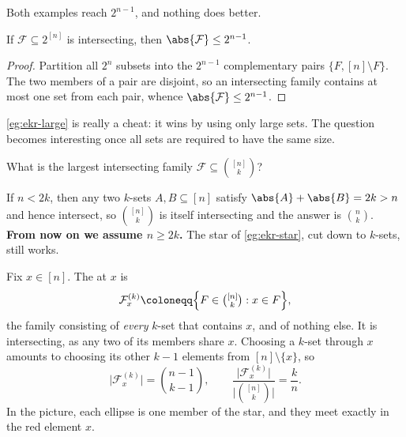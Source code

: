 Both examples reach \(2^{n-1}\), and nothing does better.

\begin{proposition}\label{prop:ekr-trivial}
    If \(\mathcal{F} \subseteq 2^{[n]}\) is intersecting, then \(\abs{\mathcal{F}} \le 2^{n-1}\).
\end{proposition}

\begin{proof}
    Partition all \(2^n\) subsets into the \(2^{n-1}\) complementary pairs \(\{F, [n] \setminus F\}\). The two members of a pair are disjoint, so an intersecting family contains at most one set from each pair, whence \(\abs{\mathcal{F}} \le 2^{n-1}\).
\end{proof}

\autoref{eg:ekr-large} is really a cheat: it wins by using only large sets. The question becomes interesting once all sets are required to have the same size.

\begin{question}\label{q:ekr}
    What is the largest intersecting family \(\mathcal{F} \subseteq \binom{[n]}{k}\)?
\end{question}

If \(n < 2k\), then any two \(k\)-sets \(A, B \subseteq [n]\) satisfy \(\abs{A} + \abs{B} = 2k > n\) and hence intersect, so \(\binom{[n]}{k}\) is itself intersecting and the answer is \(\binom{n}{k}\). \textbf{From now on we assume \(n \ge 2k\).} The star of \autoref{eg:ekr-star}, cut down to \(k\)-sets, still works.

\begin{eg}\label{eg:ekr-kstar}
    Fix \(x \in [n]\). The  at \(x\) is
    \[
        \mathcal{F}_x^{(k)} \coloneqq \Bigl\{ F \in \tbinom{[n]}{k} : x \in F \Bigr\},
    \]
    the family consisting of \emph{every} \(k\)-set that contains \(x\), and of nothing else. It is intersecting, as any two of its members share \(x\). Choosing a \(k\)-set through \(x\) amounts to choosing its other \(k-1\) elements from \([n] \setminus \{x\}\), so
    \[
        \bigl\lvert \mathcal{F}_x^{(k)} \bigr\rvert = \binom{n-1}{k-1},
        \qquad
        \frac{\bigl\lvert \mathcal{F}_x^{(k)} \bigr\rvert}{\bigl\lvert \binom{[n]}{k} \bigr\rvert} = \frac{k}{n}.
    \]
    In the picture, each ellipse is one member of the star, and they meet exactly in the red element \(x\).
    \begin{center}
    \end{center}
\end{eg}

